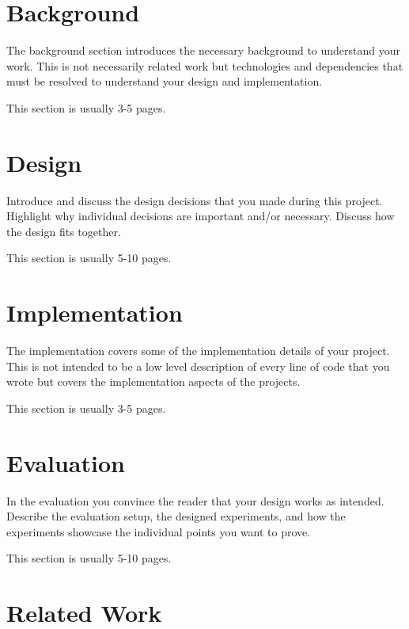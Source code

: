 \documentclass[a4paper,11pt,oneside]{report}
\begin{document}
\chapter{Background}

The background section introduces the necessary background to understand your
work. This is not necessarily related work but technologies and dependencies
that must be resolved to understand your design and implementation.

This section is usually 3-5 pages.


\chapter{Design}

Introduce and discuss the design decisions that you made during this project.
Highlight why individual decisions are important and/or necessary. Discuss
how the design fits together.

This section is usually 5-10 pages.


\chapter{Implementation}

The implementation covers some of the implementation details of your project.
This is not intended to be a low level description of every line of code that
you wrote but covers the implementation aspects of the projects.

This section is usually 3-5 pages.


\chapter{Evaluation}

In the evaluation you convince the reader that your design works as intended.
Describe the evaluation setup, the designed experiments, and how the
experiments showcase the individual points you want to prove.

This section is usually 5-10 pages.


\chapter{Related Work}
\end{document}
